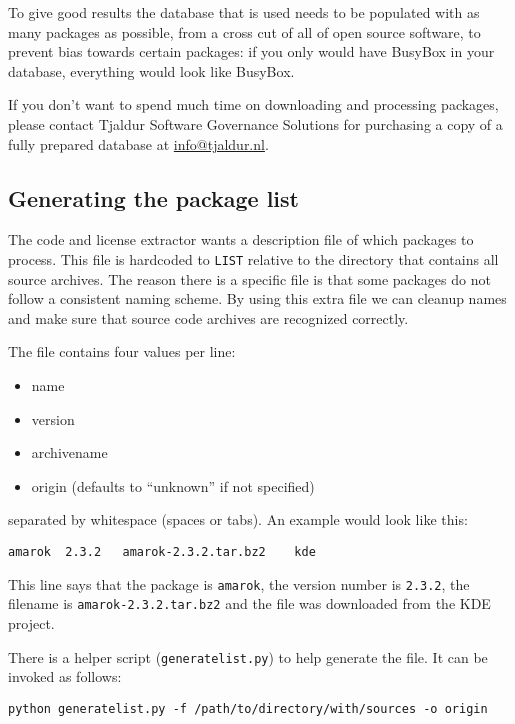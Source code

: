 \documentclass[10pt]{article}
\begin{document}
To give good results the database that is used needs to be populated with as
many packages as possible, from a cross cut of all of open source software, to
prevent bias towards certain packages: if you only would have BusyBox in your
database, everything would look like BusyBox.

If you don't want to spend much time on downloading and processing
packages, please contact Tjaldur Software Governance Solutions for
purchasing a copy of a fully prepared database at \url{info@tjaldur.nl}.

\subsection{Generating the package list}

The code and license extractor wants a description file of which packages to
process. This file is hardcoded to \texttt{LIST} relative to the directory that
contains all source archives. The reason there is a specific file is that some
packages do not follow a consistent naming scheme. By using this extra file we
can cleanup names and make sure that source code archives are recognized
correctly.

The file contains four values per line:

\begin{itemize}
\item name
\item version
\item archivename
\item origin (defaults to ``unknown'' if not specified)
\end{itemize}

separated by whitespace (spaces or tabs). An example would look like this:

\begin{verbatim}
amarok	2.3.2	amarok-2.3.2.tar.bz2	kde
\end{verbatim}

This line says that the package is \texttt{amarok}, the version number is
\texttt{2.3.2}, the filename is \texttt{amarok-2.3.2.tar.bz2} and the file
was downloaded from the KDE project.

There is a helper script (\texttt{generatelist.py}) to help generate the file.
It can be invoked as follows:

\begin{verbatim}
python generatelist.py -f /path/to/directory/with/sources -o origin
\end{verbatim}
\end{document}
